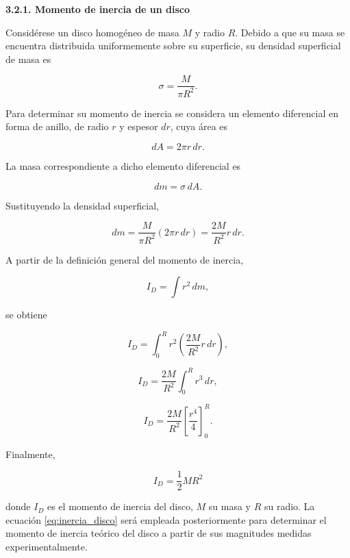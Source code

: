 \documentclass[11pt,a4paper]{article}
\begin{document}

\begin{list}{}{\leftmargin=1.2cm\rightmargin=0cm}
\item[]

\textbf{3.2.1. Momento de inercia de un disco}

\vspace{0.3em}

Considérese un disco homogéneo de masa \(M\) y radio \(R\). Debido a que su
masa se encuentra distribuida uniformemente sobre su superficie, su densidad
superficial de masa es

\[
\sigma=\frac{M}{\pi R^2}.
\]

Para determinar su momento de inercia se considera un elemento diferencial
en forma de anillo, de radio \(r\) y espesor \(dr\), cuya área es

\[
dA=2\pi r\,dr.
\]

La masa correspondiente a dicho elemento diferencial es

\[
dm=\sigma\,dA.
\]

Sustituyendo la densidad superficial,

\[
dm=
\frac{M}{\pi R^2}(2\pi r\,dr)
=
\frac{2M}{R^2}r\,dr.
\]

A partir de la definición general del momento de inercia,

\[
I_D=\int r^2\,dm,
\]

se obtiene

\[
I_D=
\int_0^R
r^2
\left(
\frac{2M}{R^2}r\,dr
\right),
\]

\[
I_D=
\frac{2M}{R^2}
\int_0^R r^3\,dr,
\]

\[
I_D=
\frac{2M}{R^2}
\left[
\frac{r^4}{4}
\right]_0^R.
\]

Finalmente,

\begin{equation}
I_D=\frac{1}{2}MR^2
\label{eq:inercia_disco}
\end{equation}

donde \(I_D\) es el momento de inercia del disco, \(M\) su masa y \(R\)
su radio. La ecuación \eqref{eq:inercia_disco} será empleada posteriormente
para determinar el momento de inercia teórico del disco a partir de sus
magnitudes medidas experimentalmente.




\end{list}
\end{document}
